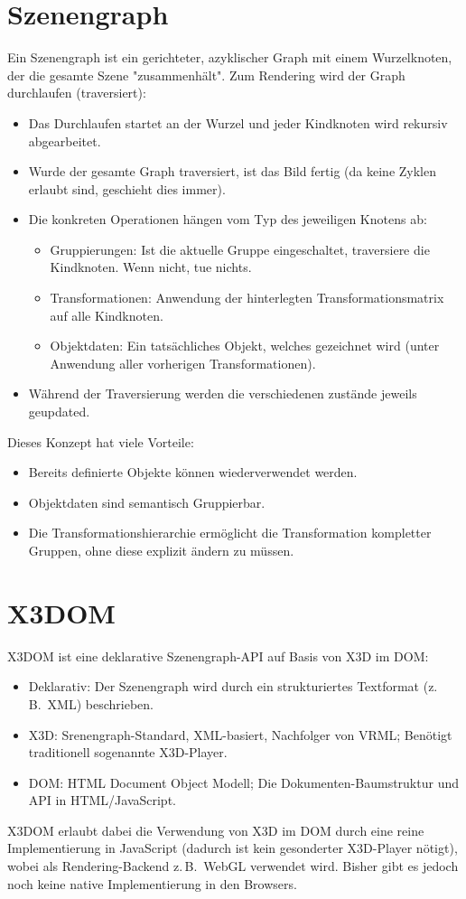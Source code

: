 \documentclass[a4paper, 11pt, accentcolor = tud3b]{tudreport}
\newcommand{\zB}{z.\,B.~}
\begin{document}
		\section{Szenengraph}
			Ein Szenengraph ist ein gerichteter, azyklischer Graph mit einem Wurzelknoten, der die gesamte Szene "zusammenhält". Zum Rendering wird der Graph durchlaufen (traversiert):
			\begin{itemize}
				\item Das Durchlaufen startet an der Wurzel und jeder Kindknoten wird rekursiv abgearbeitet.
				\item Wurde der gesamte Graph traversiert, ist das Bild fertig (da keine Zyklen erlaubt sind, geschieht dies immer).
				\item Die konkreten Operationen hängen vom Typ des jeweiligen Knotens ab:
					\begin{itemize}
						\item Gruppierungen: Ist die aktuelle Gruppe eingeschaltet, traversiere die Kindknoten. Wenn nicht, tue nichts.
						\item Transformationen: Anwendung der hinterlegten Transformationsmatrix auf alle Kindknoten.
						\item Objektdaten: Ein tatsächliches Objekt, welches gezeichnet wird (unter Anwendung aller vorherigen Transformationen).
					\end{itemize}
				\item Während der Traversierung werden die verschiedenen zustände jeweils geupdated.
			\end{itemize}
			Dieses Konzept hat viele Vorteile:
			\begin{itemize}
				\item Bereits definierte Objekte können wiederverwendet werden.
				\item Objektdaten sind semantisch Gruppierbar.
				\item Die Transformationshierarchie ermöglicht die Transformation kompletter Gruppen, ohne diese explizit ändern zu müssen.
			\end{itemize}

		\section{X3DOM}
			X3DOM ist eine deklarative Szenengraph-API auf Basis von X3D im DOM:
			\begin{itemize}
				\item Deklarativ: Der Szenengraph wird durch ein strukturiertes Textformat (\zB XML) beschrieben.
				\item X3D: Srenengraph-Standard, XML-basiert, Nachfolger von VRML; Benötigt traditionell sogenannte X3D-Player.
				\item DOM: HTML Document Object Modell; Die Dokumenten-Baumstruktur und API in HTML/JavaScript.
			\end{itemize}
			X3DOM erlaubt dabei die Verwendung von X3D im DOM durch eine reine Implementierung in JavaScript (dadurch ist kein gesonderter X3D-Player nötigt), wobei als Rendering-Backend \zB WebGL verwendet wird. Bisher gibt es jedoch noch keine native Implementierung in den Browsers.
\end{document}
